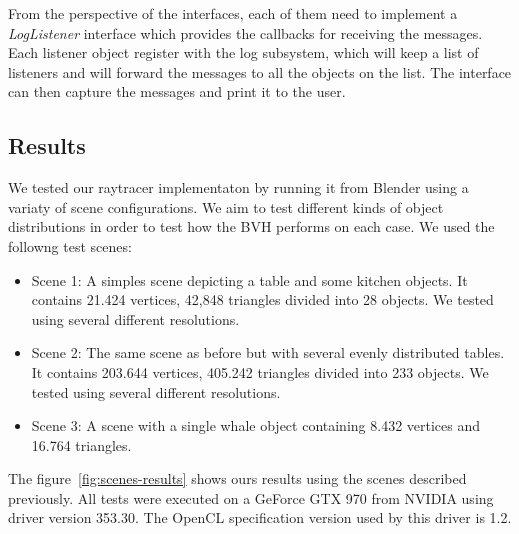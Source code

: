 \documentclass{vgtc}
\begin{document}
From the perspective of the interfaces, each of them need to implement
a \emph{LogListener} interface which provides the callbacks for
receiving the messages. Each listener object register with the log
subsystem, which will keep a list of listeners and will forward the
messages to all the objects on the list. The interface can then
capture the messages and print it to the user.

\subsection{Results}
\label{sec:results}

We tested our raytracer implementaton by running it from Blender using
a variaty of scene configurations. We aim to test different kinds of
object distributions in order to test how the BVH performs on each
case. We used the followng test scenes:

\begin{itemize}
\item Scene 1: A simples scene depicting a table and some kitchen objects. It
  contains 21.424 vertices, 42,848 triangles divided into 28
  objects. We tested using several different resolutions.
\item Scene 2: The same scene as before but with several evenly
  distributed tables. It contains 203.644 vertices, 405.242 triangles
  divided into 233 objects. We tested using several different
  resolutions.
\item Scene 3: A scene with a single whale object containing 8.432
  vertices and 16.764 triangles.
\end{itemize}

The figure~\ref{fig:scenes-results} shows ours results using the
scenes described previously. All tests were executed on a GeForce GTX
970 from NVIDIA using driver version 353.30. The OpenCL specification
version used by this driver is 1.2.
\end{document}
